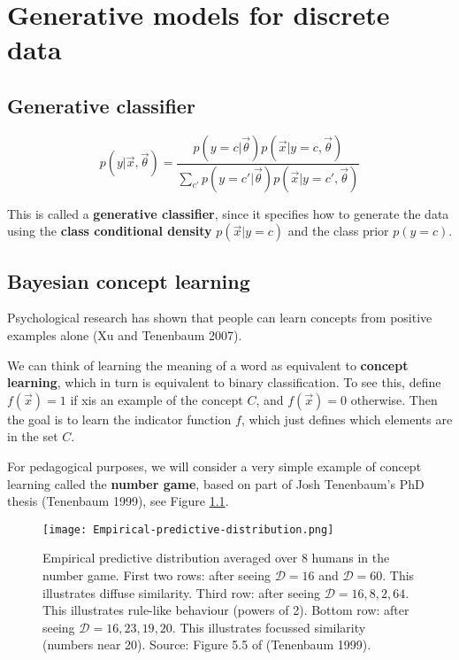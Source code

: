 \chapter{Generative models for discrete data}

\section{Generative classifier}
\begin{equation}\label{eqn:Generative-classifier}
p(y|\vec{x},\vec{\theta})=\dfrac{p(y=c|\vec{\theta})p(\vec{x}|y=c,\vec{\theta})}{\sum_{c'}{p(y=c'|\vec{\theta})p(\vec{x}|y=c',\vec{\theta})}}
\end{equation}

This is called a \textbf{generative classifier}, since it specifies how to generate the data using the \textbf{class conditional density} $p(\vec{x}|y=c)$ and the class prior $p(y=c)$. 


\section{Bayesian concept learning}
Psychological research has shown that people can learn concepts from positive examples alone (Xu and Tenenbaum 2007).

We can think of learning the meaning of a word as equivalent to \textbf{concept learning}, which in turn is equivalent to binary classification. To see this, define $f(\vec{x})=1$ if xis an example of the concept $C$, and $f(\vec{x})=0$ otherwise. Then the goal is to learn the indicator function $f$, which just defines which elements are in the set $C$.

For pedagogical purposes, we will consider a very simple example of concept learning called the \textbf{number game}, based on part of Josh Tenenbaum’s PhD thesis (Tenenbaum 1999), see Figure \ref{fig:Empirical-predictive-distribution}. 

\begin{figure}[hbtp]
\centering
    \texttt{[image: Empirical-predictive-distribution.png]}
\caption{Empirical predictive distribution averaged over 8 humans in the number game. First two rows: after seeing $\mathcal{D}={16}$ and $\mathcal{D}={60}$. This illustrates diffuse similarity. Third row: after seeing $\mathcal{D}={16,8,2,64}$. This illustrates rule-like behaviour (powers of 2). Bottom row: after seeing $\mathcal{D}={16,23,19,20}$. This illustrates focussed similarity (numbers near 20). Source: Figure 5.5 of (Tenenbaum 1999).}
\label{fig:Empirical-predictive-distribution} 
\end{figure}


